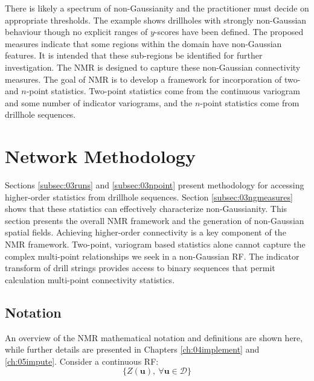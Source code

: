 There is likely a spectrum of non-Gaussianity and the practitioner must decide on appropriate thresholds. The example shows drillholes with strongly non-Gaussian behaviour though no explicit ranges of $y$-scores have been defined. The proposed measures indicate that some regions within the domain have non-Gaussian features. It is intended that these sub-regions be identified for further investigation. The \gls{NMR} is designed to capture these non-Gaussian connectivity measures. The goal of \gls{NMR} is to develop a framework for incorporation of two- and $n$-point statistics. Two-point statistics come from the continuous variogram and some number of indicator variograms, and the $n$-point statistics come from drillhole sequences.


\FloatBarrier
\section{Network Methodology}
\label{sec:method}

Sections \ref{subsec:03runs} and \ref{subsec:03npoint} present methodology for accessing higher-order statistics from drillhole sequences. Section \ref{subsec:03ngmeasures} shows that these statistics can effectively characterize non-Gaussianity. This section presents the overall \gls{NMR} framework and the generation of non-Gaussian spatial fields. Achieving higher-order connectivity is a key component of the \gls{NMR} framework. Two-point, variogram based statistics alone cannot capture the complex multi-point relationships we seek in a non-Gaussian \gls{RF}. The indicator transform of drill strings provides access to binary sequences that permit calculation multi-point connectivity statistics.


\FloatBarrier
\subsection{Notation}
\label{subsec:03notation}

An overview of the \gls{NMR} mathematical notation and definitions are shown here, while further details are presented in Chapters \ref{ch:04implement} and \ref{ch:05impute}. Consider a continuous \gls{RF}:
\begin{equation}
    \{Z(\mathbf{u}), \ \forall \mathbf{u} \in \mathcal{D}\}
    \label{eq:zu}
\end{equation}

